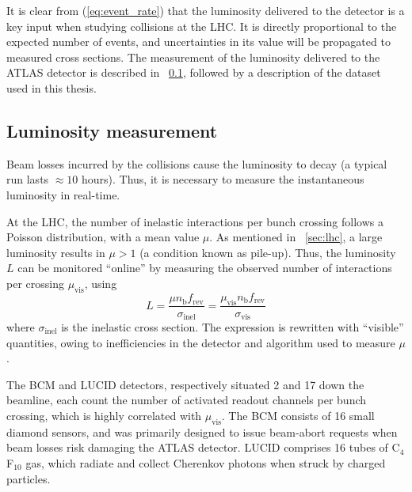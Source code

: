 
It is clear from (\ref{eq:event_rate}) that the luminosity delivered to the detector is a 
key input when studying \pp collisions at the \ac{LHC}. It is directly proportional to the 
expected number of events, and uncertainties in its value will be propagated to measured 
cross sections. The measurement of the luminosity delivered to the ATLAS detector is 
described in \Section~\ref{sec:dataset:lumi}, followed by a description of the dataset 
used in this thesis.



\subsection{Luminosity measurement}
\label{sec:dataset:lumi}

Beam losses incurred by the collisions cause the luminosity to decay (a typical run lasts 
${\approx}10$ hours). Thus, it is necessary to measure the instantaneous luminosity in 
real-time.

At the \ac{LHC}, the number of inelastic \pp interactions per bunch crossing follows a 
Poisson distribution, with a mean value $\mu$. As mentioned in \Section~\ref{sec:lhc}, 
a large luminosity results in $\mu > 1$ (a condition known as pile-up). Thus, the 
luminosity $L$ can be monitored ``online'' by measuring the observed number of interactions
per crossing $\mu_{\text{vis}}$, using \cite{Lumi2011}
\begin{equation}
	L = \frac{\mu n_{\text{b}} f_{\text{rev}}}{\sigma_{\text{inel}}}
	= \frac{\mu_{\text{vis}} n_{\text{b}} f_{\text{rev}}}{\sigma_{\text{vis}}}
	\label{eq:lumi_measure}
\end{equation}
where $\sigma_{\text{inel}}$ is the inelastic \pp cross section. The expression is 
rewritten with ``visible'' quantities, owing to inefficiencies in the detector and 
algorithm used to measure $\mu$.

The \ac{BCM} and LUCID detectors, respectively situated \unit{2}{\metre} and 
\unit{17}{\metre} down the beamline, each count the number of activated readout channels 
per bunch crossing, which is highly correlated with $\mu_{\text{vis}}$. The \ac{BCM} 
consists of 16 small diamond sensors, and was primarily designed to issue beam-abort 
requests when beam losses risk damaging the ATLAS detector. LUCID comprises 16 tubes of 
C$_4$F$_{10}$ gas, which radiate and collect Cherenkov photons when struck by charged 
particles.

